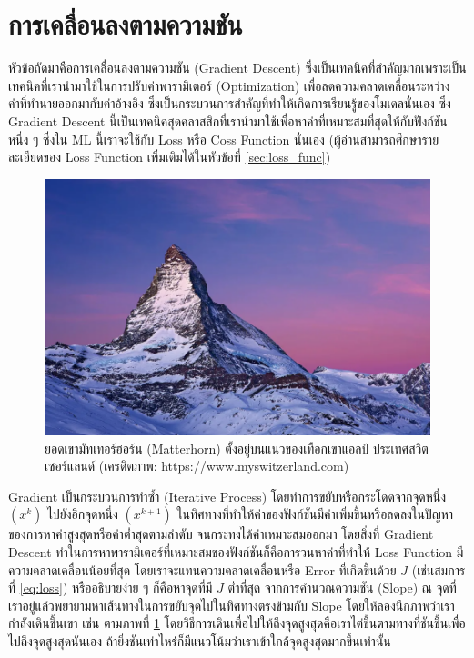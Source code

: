 \section{การเคลื่อนลงตามความชัน}
\label{sec:gradient_descent}

หัวข้อถัดมาคือการเคลื่อนลงตามความชัน (Gradient Descent) ซึ่งเป็นเทคนิคที่สำคัญมากเพราะเป็นเทคนิคที่เรานำมาใช้ในการปรับค่าพารามิเตอร์ 
(Optimization) เพื่อลดความคลาดเคลื่อนระหว่างค่าที่ทำนายออกมากับค่าอ้างอิง ซึ่งเป็นกระบวนการสำคัญที่ทำให้เกิดการเรียนรู้ของโมเดลนั่นเอง
ซึ่ง Gradient Descent นี้เป็นเทคนิคสุดคลาสสิกที่เรานำมาใช้เพื่อหาค่าที่เหมาะสมที่สุดให้กับฟังก์ชันหนึ่ง ๆ ซึ่งใน ML นี้เราจะใช้กับ Loss หรือ 
Coss Function นั่นเอง (ผู้อ่านสามารถศึกษารายละเอียดของ Loss Function เพิ่มเติมได้ในหัวข้อที่ \ref{sec:loss_func})

\begin{figure}[htbp]
    \centering
    \includegraphics[width=0.8\linewidth]{fig/matterhorn.png}
    \caption{ยอดเขามัทเทอร์ฮอร์น (Matterhorn) ตั้งอยู่บนแนวของเทือกเขาแอลป์ ประเทศสวิตเซอร์แลนด์
    (เครดิตภาพ: https://www.myswitzerland.com)}
    \label{fig:matterhorn}
\end{figure}

Gradient เป็นกระบวนการทำซ้ำ (Iterative Process) โดยทําการขยับหรือกระโดดจากจุดหนึ่ง $(x^{k})$ ไปยังอีกจุดหนึ่ง $(x^{k+1})$ 
ในทิศทางที่ทําให้ค่าของฟังก์ชันมีค่าเพิ่มขึ้นหรือลดลงในปัญหาของการหาค่าสูงสุดหรือค่าต่ำสุดตามลำดับ จนกระทงได้ค่าเหมาะสมออกมา โดยสิ่งที่ 
Gradient Descent ทำในการหาพารามิเตอร์ที่เหมาะสมของฟังก์ชันก็คือการวนหาค่าที่ทำให้ Loss Function มีความคลาดเคลื่อนน้อยที่สุด 
โดยเราจะแทนความคลาดเคลื่อนหรือ Error ที่เกิดขึ้นด้วย $J$ (เช่นสมการที่ \ref{eq:loss}) หรืออธิบายง่าย ๆ ก็คือหาจุดที่มี $J$ ต่ำที่สุด%
จากการคำนวณความชัน (Slope) ณ จุดที่เราอยู่แล้วพยายามหาเส้นทางในการขยับจุดไปในทิศทางตรงข้ามกับ Slope โดยให้ลองนึกภาพว่าเรา%
กำลังเดินขึ้นเขา เช่น ตามภาพที่ \ref{fig:matterhorn} โดยวิธีการเดินเพื่อไปให้ถึงจุดสูงสุดคือเราไต่ขึ้นตามทางที่ชันขึ้นเพื่อไปถึงจุดสูงสุดนั่นเอง 
ถ้ายิ่งชันเท่าไหร่ก็มีแนวโน้มว่าเราเข้าใกล้จุดสูงสุดมากขึ้นเท่านั้น

